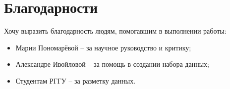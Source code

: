 \chapter{Благодарности}
Хочу выразить благодарность людям, помогавшим в выполнении работы:
\begin{itemize}
    \item Марии Пономарёвой -- за научное руководство и критику;
    \item Александре Ивойловой -- за помощь в создании набора данных;
    \item Студентам РГГУ -- за разметку данных.
\end{itemize}
